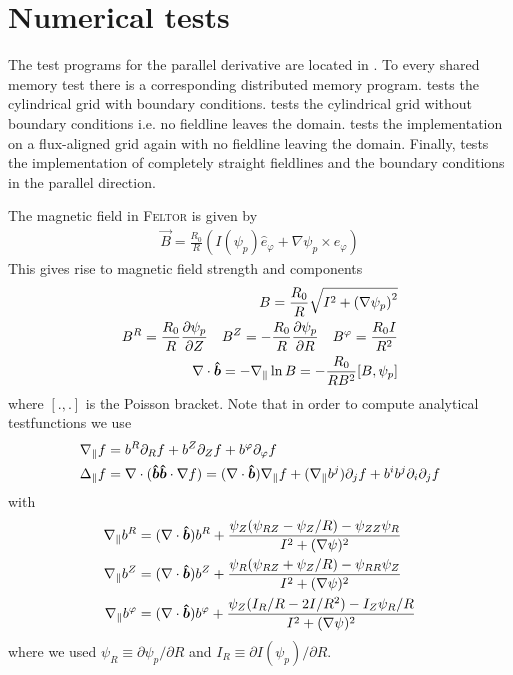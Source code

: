 \section{Numerical tests}
The test programs for the parallel derivative are located in
.
To every shared memory test 
there is a corresponding distributed memory  program.
 tests the cylindrical grid
with boundary conditions.
 tests the cylindrical grid
without boundary conditions i.e. no fieldline leaves the domain.
 tests the implementation
on a flux-aligned grid again with no fieldline leaving the domain.
Finally,  tests the implementation of
completely straight fieldlines and the boundary conditions in the
parallel direction.

The magnetic field in \textsc{Feltor} is given by
\begin{align}
  \vec B = \frac{R_0}{R}( I(\psi_p) \hat e_\varphi + \nabla\psi_p \times\hat e_\varphi)
\end{align}
This gives rise to magnetic field strength and components
\begin{align}
  B = \frac{R_0}{R} \sqrt{ I^2 + \left( \nabla\psi_p \right)^2} \\
  B^R = \frac{R_0}{R}\frac{\partial\psi_p}{\partial Z} \quad
  B^Z = -\frac{R_0}{R}\frac{\partial\psi_p}{\partial R}\quad 
  B^\varphi = \frac{R_0I}{R^2} \\
  \nabla \cdot\bm{\hat{b}} = -\nabla_\parallel \ln B = -\frac{R_0}{RB^2} [B, \psi_p]  
  \label{}
\end{align}
where $[.,.]$ is the Poisson bracket. Note that
in order to compute analytical testfunctions we use
\begin{align}
\nabla_\parallel f &= b^R\partial_R f + b^Z\partial_Z f + b^\varphi \partial_\varphi f\\
\Delta_\parallel f &= \nabla\cdot(\bm{\hat{b}}\bm{\hat{b}}\cdot \nabla f)
= (\nabla\cdot\bm{\hat{b}}) \nabla_\parallel f + (\nabla_\parallel b^j) \partial_j f
+ b^ib^j\partial_i \partial_j f
\label{}
\end{align}
with
\begin{align}
\nabla_\parallel b^R &= (\nabla\cdot \bm{\hat{b}}) b^R
+ \frac{\psi_Z (\psi_{RZ} - \psi_Z/R) - \psi_{ZZ}\psi_R}{I^2 + (\nabla\psi)^2} \\
\nabla_\parallel b^Z &= (\nabla\cdot \bm{\hat{b}}) b^Z
+ \frac{\psi_R (\psi_{RZ} + \psi_Z/R) - \psi_{RR}\psi_Z}{I^2 + (\nabla\psi)^2} \\
\nabla_\parallel b^\varphi &= (\nabla\cdot\bm{\hat{b}}) b^\varphi
+ \frac{\psi_Z(I_R/R - 2I/R^2) - I_Z\psi_R/R}{I^2 + (\nabla\psi)^2}
\label{}
\end{align}
where we used $\psi_R \equiv \partial \psi_p /\partial R$ and
$I_R \equiv \partial I(\psi_p) /\partial R$.

